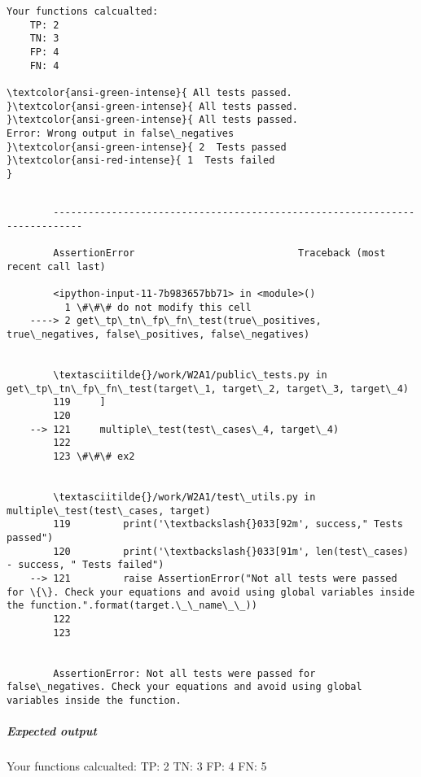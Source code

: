 \documentclass[11pt]{article}
\newenvironment{Shaded}{}{}
\newcommand{\DecValTok}[1]{\textcolor[rgb]{0.25,0.63,0.44}{{#1}}}
\newcommand{\NormalTok}[1]{{#1}}
\begin{document}
    
    \begin{Verbatim}[commandchars=\\\{\}]
Your functions calcualted: 
    TP: 2
    TN: 3
    FP: 4
    FN: 4
    
\textcolor{ansi-green-intense}{ All tests passed.
}\textcolor{ansi-green-intense}{ All tests passed.
}\textcolor{ansi-green-intense}{ All tests passed.
Error: Wrong output in false\_negatives
}\textcolor{ansi-green-intense}{ 2  Tests passed
}\textcolor{ansi-red-intense}{ 1  Tests failed
}
    \end{Verbatim}

    \begin{Verbatim}[commandchars=\\\{\}]

        ---------------------------------------------------------------------------

        AssertionError                            Traceback (most recent call last)

        <ipython-input-11-7b983657bb71> in <module>()
          1 \#\#\# do not modify this cell
    ----> 2 get\_tp\_tn\_fp\_fn\_test(true\_positives, true\_negatives, false\_positives, false\_negatives)
    

        \textasciitilde{}/work/W2A1/public\_tests.py in get\_tp\_tn\_fp\_fn\_test(target\_1, target\_2, target\_3, target\_4)
        119     ]
        120 
    --> 121     multiple\_test(test\_cases\_4, target\_4)
        122 
        123 \#\#\# ex2


        \textasciitilde{}/work/W2A1/test\_utils.py in multiple\_test(test\_cases, target)
        119         print('\textbackslash{}033[92m', success," Tests passed")
        120         print('\textbackslash{}033[91m', len(test\_cases) - success, " Tests failed")
    --> 121         raise AssertionError("Not all tests were passed for \{\}. Check your equations and avoid using global variables inside the function.".format(target.\_\_name\_\_))
        122 
        123 


        AssertionError: Not all tests were passed for false\_negatives. Check your equations and avoid using global variables inside the function.

    \end{Verbatim}

    \hypertarget{expected-output}{%
\subparagraph{Expected output}\label{expected-output}}

\begin{Shaded}
\begin{Highlighting}[]
\NormalTok{Your functions calcualted: }
\NormalTok{    TP: }\DecValTok{2}
\NormalTok{    TN: }\DecValTok{3}
\NormalTok{    FP: }\DecValTok{4}
\NormalTok{    FN: }\DecValTok{5}
\end{Highlighting}
\end{Shaded}
\end{document}
